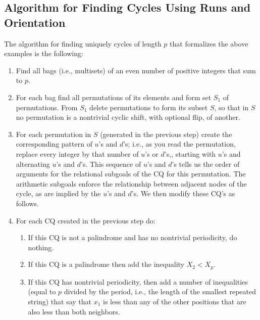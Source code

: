 \subsection{Algorithm for Finding Cycles Using Runs and Orientation}

The algorithm for finding uniquely cycles of length $p$ that formalizes the above examples is the following:

\begin{enumerate}

\item Find all bags (i.e., multisets) of an even number of positive integers that sum to $p$.

\item
For each bag find all permutations of its elements
and form set $S_1$ of permutations. From $S_1$ delete permutations to form its subset $S$, so that in $S$ no permutation is a nontrivial cyclic shift, with optional flip, of another.

\item
For each permutation in $S$  (generated in the previous
step) create the corresponding pattern of $u$'s and $d$'s; i.e., as you read the permutation, replace every integer by that number of $u$'s or $d$'s,, starting with $u$'s and alternating $u$'s and $d$'s.
This sequence of $u$'s and $d$'s tells us the order of arguments for the relational subgoals of the CQ for this permutation.  The arithmetic subgoals enforce the relationship between adjacent nodes of the cycle, as are implied by the $u$'s and $d$'s.  We then modify these CQ's as follows.

\item
For each CQ created in the previous step do:

\begin{enumerate}

\item If this CQ is not a palindrome and has no nontrivial periodicity, do nothing.

\item If this CQ is a palindrome then add the inequality $X_2<X_p$.

\item If this CQ has nontrivial periodicity, then add a number of inequalities
(equal to $p$ divided by the period, i.e., the length of the
smallest repeated string) that say that
$x_1$ is less than any of the other positions that are also less than
both neighbors.

\end{enumerate}
\end{enumerate}



